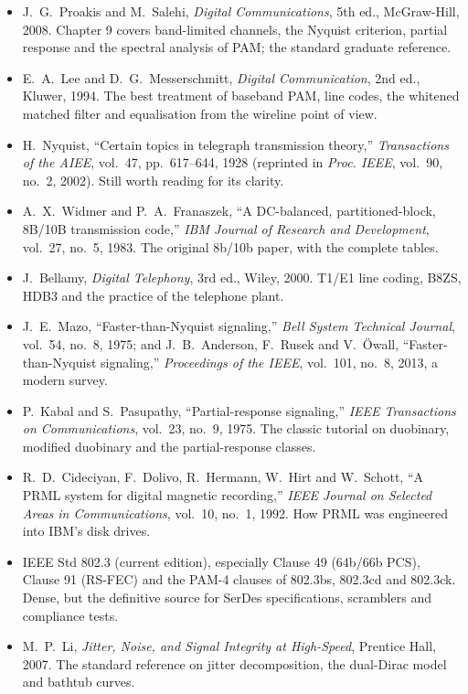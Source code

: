 \furtherreading
\begin{itemize}
\item J.~G.~Proakis and M.~Salehi, \emph{Digital Communications}, 5th ed., McGraw-Hill, 2008.
Chapter 9 covers band-limited channels, the Nyquist criterion, partial response and the
spectral analysis of PAM; the standard graduate reference.
\item E.~A.~Lee and D.~G.~Messerschmitt, \emph{Digital Communication}, 2nd ed., Kluwer, 1994. The
best treatment of baseband PAM, line codes, the whitened matched filter and equalisation from the
wireline point of view.
\item H.~Nyquist, ``Certain topics in telegraph transmission theory,'' \emph{Transactions of the
AIEE}, vol.~47, pp.~617--644, 1928 (reprinted in \emph{Proc. IEEE}, vol.~90, no.~2, 2002). Still
worth reading for its clarity.
\item A.~X.~Widmer and P.~A.~Franaszek, ``A DC-balanced, partitioned-block, 8B/10B transmission
code,'' \emph{IBM Journal of Research and Development}, vol.~27, no.~5, 1983. The original 8b/10b
paper, with the complete tables.
\item J.~Bellamy, \emph{Digital Telephony}, 3rd ed., Wiley, 2000. T1/E1 line coding, B8ZS, HDB3 and
the practice of the telephone plant.
\item J.~E.~Mazo, ``Faster-than-Nyquist signaling,'' \emph{Bell System Technical Journal},
vol.~54, no.~8, 1975; and J.~B.~Anderson, F.~Rusek and V.~\"Owall, ``Faster-than-Nyquist
signaling,'' \emph{Proceedings of the IEEE}, vol.~101, no.~8, 2013, a modern survey.
\item P.~Kabal and S.~Pasupathy, ``Partial-response signaling,'' \emph{IEEE Transactions on
Communications}, vol.~23, no.~9, 1975. The classic tutorial on duobinary, modified duobinary and
the partial-response classes.
\item R.~D.~Cideciyan, F.~Dolivo, R.~Hermann, W.~Hirt and W.~Schott, ``A PRML system for digital
magnetic recording,'' \emph{IEEE Journal on Selected Areas in Communications}, vol.~10, no.~1,
1992. How PRML was engineered into IBM's disk drives.
\item IEEE Std 802.3 (current edition), especially Clause 49 (64b/66b PCS), Clause 91 (RS-FEC) and
the PAM-4 clauses of 802.3bs, 802.3cd and 802.3ck. Dense, but the definitive source for SerDes
specifications, scramblers and compliance tests.
\item M.~P.~Li, \emph{Jitter, Noise, and Signal Integrity at High-Speed}, Prentice Hall, 2007. The
standard reference on jitter decomposition, the dual-Dirac model and bathtub curves.
\end{itemize}
